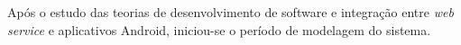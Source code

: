 
	\par Após o estudo das teorias de desenvolvimento de software e integração
entre \textit{web service} e aplicativos Android, iniciou-se o período de
modelagem do sistema.